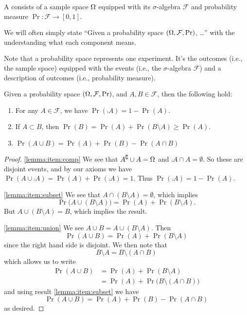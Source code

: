 A  consists of a sample space $\Omega$
equipped with its $\sigma$-algebra $\mathcal{F}$ and probability measure
$\Pr\colon\mathcal{F}\to[0,1]$. 

We will often simply state ``Given a probability space
$(\Omega, \mathcal{F},\mathop{\mathrm{Pr}}\nolimits)$, \dots'' with the understanding what
each component means.

Note that a probability space represents one experiment. It's the
outcomes (i.e., the sample space) equipped with the events (i.e., the
$\sigma$-algebra $\mathcal{F}$) and a description of outcomes (i.e.,
probability measure).

\begin{lemma}\label{lemma:probSpaceProps}
Given a probability space $(\Omega, \mathcal{F},\mathop{\mathrm{Pr}}\nolimits)$, and
$A,B\in\mathcal{F}$, then the following hold:
\begin{enumerate}
\item\label{lemma:item:comp} For any $A\in\mathcal{F}$, we have $\Pr(\comp{A})=1-\Pr(A)$.
\item\label{lemma:item:subset} If $A\subset B$, then $\Pr(B)=\Pr(A)+\Pr(B\setminus A)\geq\Pr(A)$.
\item\label{lemma:item:union} $\Pr(A\cup B)=\Pr(A)+\Pr(B)-\Pr(A\cap B)$
\end{enumerate}
\end{lemma}
\begin{proof}
\eqref{lemma:item:comp} We see that ${A}^{\complement}\cup A=\Omega$ and
$\comp{A}\cap A=\emptyset$. So these are disjoint events, and by our
axioms we have $\Pr(A\cup\comp{A})=\Pr(A)+\Pr(\comp{A})=1$. Thus
$\Pr(\comp{A})=1-\Pr(A)$.

\eqref{lemma:item:subset} We see that $A\cap(B\setminus A)=\emptyset$,
which implies 
\[
\Pr\bigl(A\cup(B\setminus A)\bigr)=\Pr(A)+\Pr(B\setminus A). 
\]
But $A\cup(B\setminus A)=B$, which implies the result.

\eqref{lemma:item:union} We see $A\cup B = A\cup(B\setminus A)$. Then
\[
\Pr(A\cup B)=\Pr(A)+\Pr(B\setminus A)
\]
since the right hand side is disjoint. We then note that
\[
B\setminus A = B\setminus (A\cap B)
\]
which allows us to write
\begin{align*}
\Pr(A\cup B)&=\Pr(A)+\Pr(B\setminus A)\\
&=\Pr(A)+\Pr\bigl(B\setminus (A\cap B)\bigr)
\end{align*}
and using result \eqref{lemma:item:subset} we have
\begin{equation}
\Pr(A\cup B)=\Pr(A)+\Pr(B)-\Pr(A\cap B)
\end{equation}
as desired.
\end{proof}

